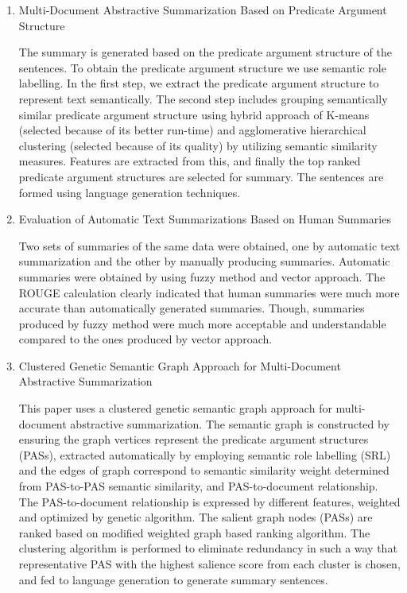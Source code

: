 \documentclass[11pt]{report}
\begin{document}
\begin{enumerate}
    \item Multi-Document Abstractive Summarization Based on Predicate Argument Structure\cite{8}

	The summary is generated based on the predicate argument structure of the sentences. To obtain the predicate argument structure we use semantic role labelling. In the first step, we extract the predicate argument structure to represent text semantically. The second step includes grouping semantically similar predicate argument structure using hybrid approach of K-means (selected because of its better run-time) and agglomerative hierarchical clustering (selected because of its quality) by utilizing semantic similarity measures. Features are extracted from this, and finally the top ranked predicate argument structures are selected for summary. The sentences are formed using language generation techniques.\\

    \item Evaluation of Automatic Text Summarizations Based on Human Summaries\cite{9}

    Two sets of summaries of the same data were obtained, one by automatic text summarization and the other by manually producing summaries. Automatic summaries were obtained by using fuzzy method and vector approach. The ROUGE calculation clearly indicated that human summaries were much more accurate than automatically generated summaries. Though, summaries produced by fuzzy method were much more acceptable and understandable compared to the ones produced by vector approach.\\

    \item Clustered Genetic Semantic Graph Approach for Multi-Document Abstractive Summarization\cite{10}

    This paper uses a clustered genetic semantic graph approach for multi-document abstractive summarization. The semantic graph is constructed by ensuring the graph vertices represent the predicate argument structures (PASs), extracted automatically by employing semantic role labelling (SRL) and the edges of graph correspond to semantic similarity weight determined from PAS-to-PAS semantic similarity, and PAS-to-document relationship. The PAS-to-document relationship is expressed by different features, weighted and optimized by genetic algorithm. The salient graph nodes (PASs) are ranked based on modified weighted graph based ranking algorithm. The clustering algorithm is performed to eliminate redundancy in such a way that representative PAS with the highest salience score from each cluster is chosen, and fed to language generation to generate summary sentences. \\


\end{enumerate}
\end{document}
